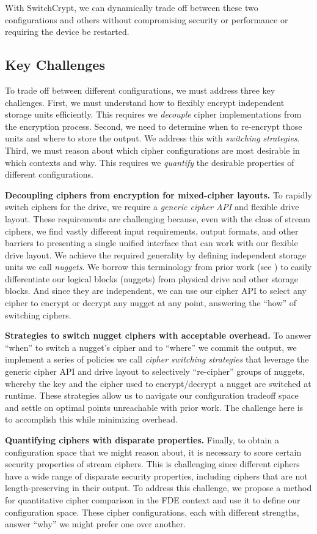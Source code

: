 With SwitchCrypt, we can dynamically trade off between these two configurations
and others without compromising security or performance or requiring the device
be restarted.

\subsection{Key Challenges}

To trade off between different configurations, we must address three key
challenges. First, we must understand how to flexibly encrypt independent
storage units efficiently. This requires we \emph{decouple} cipher
implementations from the encryption process. Second, we need to determine when
to re-encrypt those units and where to store the output. We address this with
\emph{switching strategies}. Third, we must reason about which cipher
configurations are most desirable in which contexts and why. This requires we
\emph{quantify} the desirable properties of different configurations.

\textbf{Decoupling ciphers from encryption for mixed-cipher layouts.} To rapidly
switch ciphers for the drive, we require a \emph{generic cipher API} and
flexible drive layout. These requirements are challenging because, even with the
class of stream ciphers, we find vastly different input requirements, output
formats, and other barriers to presenting a single unified interface that can
work with our flexible drive layout. We achieve the required generality by
defining independent storage units we call \emph{nuggets}. We borrow this
terminology from prior work (see \cite{StrongBox}) to easily differentiate our
logical blocks (nuggets) from physical drive and other storage blocks. And since
they are independent, we can use our cipher API to select any cipher to encrypt
or decrypt any nugget at any point, answering the ``how'' of switching ciphers.

\textbf{Strategies to switch nugget ciphers with acceptable overhead.} To answer
``when'' to switch a nugget's cipher and to ``where'' we commit the output, we
implement a series of policies we call \textit{cipher switching strategies} that
leverage the generic cipher API and drive layout to selectively ``re-cipher''
groups of nuggets, whereby the key and the cipher used to encrypt/decrypt a
nugget are switched at runtime. These strategies allow us to navigate our
configuration tradeoff space and settle on optimal points unreachable with prior
work. The challenge here is to accomplish this while minimizing overhead.

\textbf{Quantifying ciphers with disparate properties.} Finally, to obtain a
configuration space that we might reason about, it is necessary to score certain
security properties of stream ciphers. This is challenging since different
ciphers have a wide range of disparate security properties, including ciphers
that are not length-preserving in their output. To address this challenge, we
propose a method for quantitative cipher comparison in the FDE context and use
it to define our configuration space. These cipher configurations, each with
different strengths, answer ``why'' we might prefer one over another.
